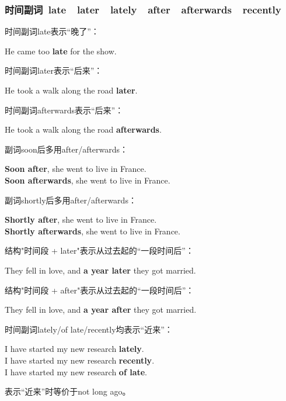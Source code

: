 \documentclass[UTF8]{ctexart}
\newcommand{\littf}[1]{{\hspace{3pt}\ttfamily #1}}
\begin{document}
\newpage

\subsubsection{时间副词~\littf{late}~~\littf{later}~~\littf{lately}~~\littf{after}~~\littf{afterwards}~~\littf{recently}}
    时间副词\littf{late}表示“晚了”：
    \begin{center}
        \large\ttfamily
        He came too \textbf{late} for the show.\\[6mm]
    \end{center}
    时间副词\littf{later}表示“后来”：
    \begin{center}
        \large\ttfamily
        He took a walk along the road \textbf{later}.\\[6mm]
    \end{center}
    时间副词\littf{afterwards}表示“后来”：
    \begin{center}
        \large\ttfamily
        He took a walk along the road \textbf{afterwards}.\\[6mm]
    \end{center}
    副词\littf{soon}后多用\littf{after/afterwards}：
    \begin{center}
        \large\ttfamily
        \textbf{Soon after}, she went to live in France.\\[3mm]
        \textbf{Soon afterwards}, she went to live in France.\\[6mm]
    \end{center}
    副词\littf{shortly}后多用\littf{after/afterwards}：
    \begin{center}
        \large\ttfamily
        \textbf{Shortly after}, she went to live in France.\\[3mm]
        \textbf{Shortly afterwards}, she went to live in France.\\[6mm]
    \end{center}
    结构\littf{"\hspace{0pt}时间段 + later"}表示从过去起的“一段时间后”：
    \begin{center}
        \large\ttfamily
        They fell in love, and \textbf{a year later} they got married.\\[6mm]
    \end{center}
    结构\littf{"\hspace{0pt}时间段 + after"}表示从过去起的“一段时间后”：
    \begin{center}
        \large\ttfamily
        They fell in love, and \textbf{a year after} they got married.\\[6mm]
    \end{center}
    时间副词\littf{lately/of late/recently}均表示“近来”：
    \begin{center}
        \large\ttfamily
        I have started my new research \textbf{lately}.\\[3mm]
        I have started my new research \textbf{recently}.\\[3mm]
        I have started my new research \textbf{of late}.\\[6mm]
    \end{center}
    表示“近来”时等价于\littf{not long ago}。
\end{document}
